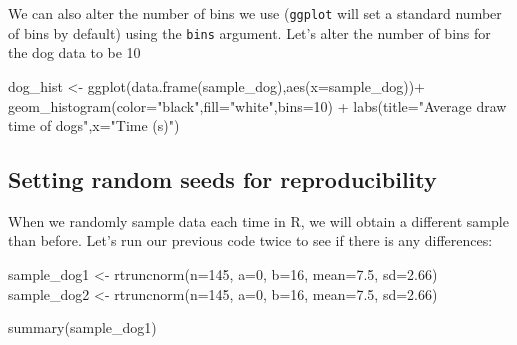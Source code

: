 \documentclass[
]{book}
\newenvironment{Shaded}{\begin{snugshade}}{\end{snugshade}}
\newcommand{\AttributeTok}[1]{\textcolor[rgb]{0.77,0.63,0.00}{#1}}
\newcommand{\DecValTok}[1]{\textcolor[rgb]{0.00,0.00,0.81}{#1}}
\newcommand{\FloatTok}[1]{\textcolor[rgb]{0.00,0.00,0.81}{#1}}
\newcommand{\FunctionTok}[1]{\textcolor[rgb]{0.00,0.00,0.00}{#1}}
\newcommand{\NormalTok}[1]{#1}
\newcommand{\OtherTok}[1]{\textcolor[rgb]{0.56,0.35,0.01}{#1}}
\newcommand{\SpecialCharTok}[1]{\textcolor[rgb]{0.00,0.00,0.00}{#1}}
\newcommand{\StringTok}[1]{\textcolor[rgb]{0.31,0.60,0.02}{#1}}
\begin{document}
We can also alter the number of bins we use (\texttt{ggplot} will set a standard number of bins by default) using the \texttt{bins} argument. Let's alter the number of bins for the dog data to be 10

\begin{Shaded}
\begin{Highlighting}[]
\NormalTok{dog\_hist }\OtherTok{\textless{}{-}} \FunctionTok{ggplot}\NormalTok{(}\FunctionTok{data.frame}\NormalTok{(sample\_dog),}\FunctionTok{aes}\NormalTok{(}\AttributeTok{x=}\NormalTok{sample\_dog))}\SpecialCharTok{+}
  \FunctionTok{geom\_histogram}\NormalTok{(}\AttributeTok{color=}\StringTok{"black"}\NormalTok{,}\AttributeTok{fill=}\StringTok{"white"}\NormalTok{,}\AttributeTok{bins=}\DecValTok{10}\NormalTok{) }\SpecialCharTok{+} 
  \FunctionTok{labs}\NormalTok{(}\AttributeTok{title=}\StringTok{"Average draw time of dogs"}\NormalTok{,}\AttributeTok{x=}\StringTok{"Time (s)"}\NormalTok{)}
\end{Highlighting}
\end{Shaded}

\hypertarget{setting-random-seeds-for-reproducibility}{%
\subsection{Setting random seeds for reproducibility}\label{setting-random-seeds-for-reproducibility}}

When we randomly sample data each time in R, we will obtain a different sample than before. Let's run our previous code twice to see if there is any differences:

\begin{Shaded}
\begin{Highlighting}[]
\NormalTok{sample\_dog1 }\OtherTok{\textless{}{-}} \FunctionTok{rtruncnorm}\NormalTok{(}\AttributeTok{n=}\DecValTok{145}\NormalTok{, }\AttributeTok{a=}\DecValTok{0}\NormalTok{, }\AttributeTok{b=}\DecValTok{16}\NormalTok{, }\AttributeTok{mean=}\FloatTok{7.5}\NormalTok{, }\AttributeTok{sd=}\FloatTok{2.66}\NormalTok{)}
\NormalTok{sample\_dog2 }\OtherTok{\textless{}{-}} \FunctionTok{rtruncnorm}\NormalTok{(}\AttributeTok{n=}\DecValTok{145}\NormalTok{, }\AttributeTok{a=}\DecValTok{0}\NormalTok{, }\AttributeTok{b=}\DecValTok{16}\NormalTok{, }\AttributeTok{mean=}\FloatTok{7.5}\NormalTok{, }\AttributeTok{sd=}\FloatTok{2.66}\NormalTok{)}

\FunctionTok{summary}\NormalTok{(sample\_dog1)}
\end{Highlighting}
\end{Shaded}
\end{document}
